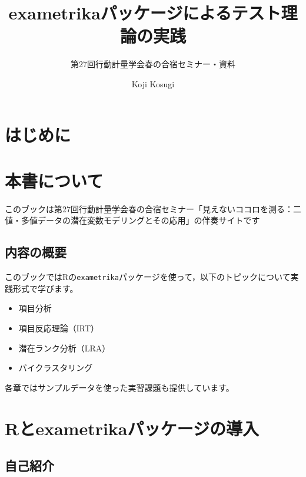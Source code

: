 \documentclass[
  a4paper,
]{ltjsbook}
\title{exametrikaパッケージによるテスト理論の実践}
\subtitle{第27回行動計量学会春の合宿セミナー・資料}
\author{Koji Kosugi}
\date{}
\providecommand{\tightlist}{%
  \setlength{\itemsep}{0pt}\setlength{\parskip}{0pt}}\usepackage{longtable,booktabs,array}
\renewcommand*\contentsname{Table of contents}
\newcommand\contentsname{Table of contents}
\begin{document}
\maketitle

\renewcommand*\contentsname{Table of contents}
{
\hypersetup{linkcolor=}
\setcounter{tocdepth}{2}
\tableofcontents
}


\chapter{はじめに}\label{ux306fux3058ux3081ux306b}


\chapter{本書について}\label{ux672cux66f8ux306bux3064ux3044ux3066}

このブックは第27回行動計量学会春の合宿セミナー「見えないココロを測る：二値・多値データの潜在変数モデリングとその応用」の伴奏サイトです

\section{内容の概要}\label{ux5185ux5bb9ux306eux6982ux8981}

このブックではRの\texttt{exametrika}パッケージを使って，以下のトピックについて実践形式で学びます。

\begin{itemize}
\tightlist
\item
  項目分析
\item
  項目反応理論（IRT）
\item
  潜在ランク分析（LRA）
\item
  バイクラスタリング
\end{itemize}

各章ではサンプルデータを使った実習課題も提供しています。


\chapter{Rとexametrikaパッケージの導入}\label{rux3068exametrikaux30d1ux30c3ux30b1ux30fcux30b8ux306eux5c0eux5165}

\section{自己紹介}\label{ux81eaux5df1ux7d39ux4ecb}
\end{document}
